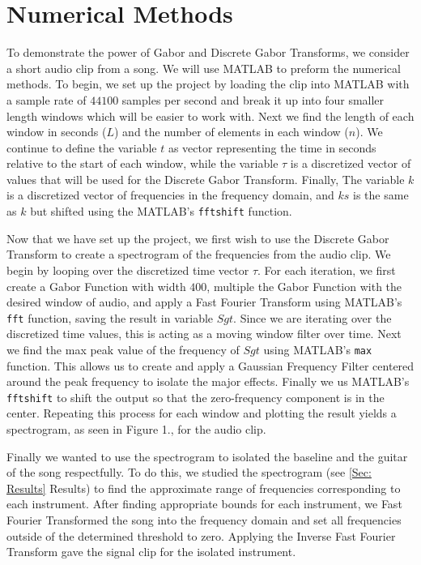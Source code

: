 \documentclass[12pt]{article}%
\begin{document}
\section{Numerical Methods}

To demonstrate the power of Gabor and Discrete Gabor Transforms, we consider a short audio clip from a song. We will use MATLAB to preform the numerical methods. To begin, we set up the project by loading the clip into MATLAB with a sample rate of $44100$ samples per second and break it up into four smaller length windows which will be easier to work with. Next we find the length of each window in seconds ($L$) and the number of elements in each window ($n$). We continue to define the variable $t$ as vector representing the time in seconds relative to the start of each window, while the variable $\tau$ is a discretized vector of values that will be used for the Discrete Gabor Transform. Finally, The variable $k$ is a discretized vector of frequencies in the frequency domain, and $ks$ is the same as $k$ but shifted using the MATLAB's \verb+fftshift+ function. 

Now that we have set up the project, we first wish to use the Discrete Gabor Transform to create a spectrogram of the frequencies from the audio clip. We begin by looping over the discretized time vector $\tau$. For each iteration, we first create a Gabor Function with width $400$, multiple the Gabor Function with the desired window of audio, and apply a Fast Fourier Transform using MATLAB's \verb+fft+ function, saving the result in variable $Sgt$. Since we are iterating over the discretized time values, this is acting as a moving window filter over time. Next we find the max peak value of the frequency of $Sgt$ using MATLAB's \verb+max+ function. This allows us to create and apply a Gaussian Frequency Filter centered around the peak frequency to isolate the major effects. Finally we us MATLAB's \verb+fftshift+ to shift the output so that the zero-frequency component is in the center. Repeating this process for each window and plotting the result yields a spectrogram, as seen in Figure 1., for the audio clip. 

Finally we wanted to use the spectrogram to isolated the baseline and the guitar of the song respectfully. To do this, we studied the spectrogram (see \ref{Sec: Results} Results) to find the approximate range of frequencies corresponding to each instrument. After finding appropriate bounds for each instrument, we Fast Fourier Transformed the song into the frequency domain and set all frequencies outside of the determined threshold to zero. Applying the Inverse Fast Fourier Transform gave the signal clip for the isolated instrument.    
\end{document}
